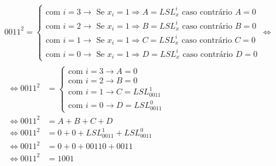 \begin{gather}
    0011^2 = \begin{cases}
        \text{com $i=3 \rightarrow$ Se $x_i = 1 \Rightarrow A= LSL_{x}^i$ caso contrário $A=0$} \\
        \text{com $i=2 \rightarrow$ Se $x_i = 1 \Rightarrow B=LSL_{x}^i$ caso contrário $B=0$}  \\
        \text{com $i=1 \rightarrow$ Se $x_i = 1 \Rightarrow C=LSL_{x}^i$ caso contrário $C=0$}  \\
        \text{com $i=0 \rightarrow$ Se $x_i = 1 \Rightarrow D=LSL_{x}^i$ caso contrário $D=0$}
    \end{cases} \Leftrightarrow \\
    \begin{align}
        \Leftrightarrow 0011^2 & =
        \begin{cases}
            \text{com $i=3 \rightarrow A = 0$}            \\
            \text{com $i=2 \rightarrow B = 0$}            \\
            \text{com $i=1 \rightarrow C = LSL_{0011}^1$} \\
            \text{com $i=0 \rightarrow D = LSL_{0011}^0$}
        \end{cases} \\
        \Leftrightarrow 0011^2 & = A + B + C + D                         \\
        \Leftrightarrow 0011^2 & = 0 + 0 + LSL_{0011}^1 + LSL_{0011}^0   \\
        \Leftrightarrow 0011^2 & = 0 + 0 + 00110 + 0011                  \\
        \Leftrightarrow 0011^2 & = 1001
    \end{align}
\end{gather}